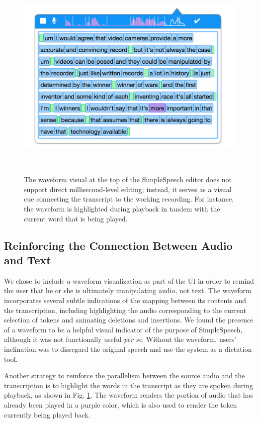 \begin{figure}
	\centering
	\includegraphics[width=\columnwidth,keepaspectratio]{figures/playback}
	\caption{The waveform visual at the top of the SimpleSpeech editor does not support direct millisecond-level editing; instead, it serves as a visual cue connecting the transcript to the working recording. For instance, the waveform is highlighted during playback in tandem with the current word that is being played.}~\label{fig:playback}
\end{figure}

\subsection{Reinforcing the Connection Between Audio and Text}
We chose to include a waveform visualization as part of the UI in order to remind the user that he or she is ultimately manipulating audio, not text. The waveform incorporates several subtle indications of the mapping between its contents and the transcription, including highlighting the audio corresponding to the current selection of tokens and animating deletions and insertions.
We found the presence of a waveform to be a helpful visual indicator of the purpose of SimpleSpeech, although it was not functionally useful \textit{per se}.
Without the waveform, users' inclination was to disregard the original speech and use the system as a dictation tool.

Another strategy to reinforce the parallelism between the source audio and the transcription is to highlight the words in the transcript as they are spoken during playback, as shown in Fig. \ref{fig:playback}.
The waveform renders the portion of audio that has already been played in a purple color, which is also used to render the token currently being played back.

